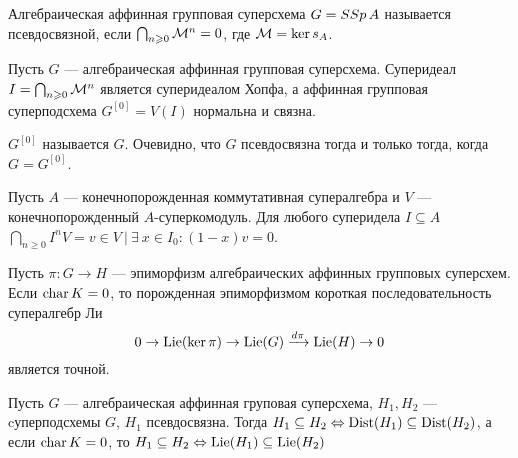 \begin{subsection}{}
  \begin{definition}
    Алгебраическая аффинная групповая суперсхема $ G = SSp\, A $ называется
    псевдосвязной, если $ \bigcap_{n \geqslant 0} \mathcal{M}^n = 0 $, где $ \mathcal{M} = \ker s_A $.
  \end{definition}

  \begin{lemma}
    Пусть $ G $ --- алгебраическая аффинная групповая суперсхема. Суперидеал
    $ I = \bigcap_{n \geqslant 0} \mathcal{M}^n $ является суперидеалом Хопфа, а
    аффинная групповая суперподсхема $ G^{[0]} = V(I) $ нормальна и связна.
  \end{lemma}

  $ G^{[0]} $ называется  $ G $. Очевидно, что
  $ G $ псевдосвязна тогда и только тогда, когда $ G = G^{[0]} $.

  \begin{lemma}
    Пусть $ A $ --- конечнопорожденная коммутативная супералгебра и $ V $ ---
    конечнопорожденный $ A $-суперкомодуль. Для любого суперидела $ I \subseteq A $
    $ \bigcap_{n \geqslant 0} I^n V = {v \in V ~| ~\exists ~x \in I_0 : (1 - x)v = 0} $.
  \end{lemma}

  \begin{proposition}\label{exact sequence for Lie}
    Пусть $ \pi : G \to H $ --- эпиморфизм алгебраических аффинных групповых суперсхем.
    Если $ \mathop{\mathrm{char}}K = 0 $, то порожденная эпиморфизмом короткая последовательность
    супералгебр Ли
    $$ 0 \to \mathrm{Lie}(\ker\pi) \to \mathrm{Lie}(G) \xrightarrow{d\pi} \mathrm{Lie}(H) \to 0 $$
    является точной.
  \end{proposition}

  \begin{lemma}\label{subgroups iff Lie subalgebras}
    Пусть $ G $ --- алгебраическая аффинная груповая суперсхема, $ H_1, H_2 $ ---
    cуперподсхемы $ G $, $ H_1 $ псевдосвязна. Тогда
    $ H_1 \subseteq H_2 \Leftrightarrow \mathrm{Dist}(H_1) \subseteq \mathrm{Dist}(H_2) $, а если $ \mathop{\mathrm{char}}K = 0 $,
    то $ H_1 \subseteq H_2 \Leftrightarrow \mathrm{Lie}(H_1) \subseteq \mathrm{Lie}(H_2) $
  \end{lemma}


\end{subsection}
